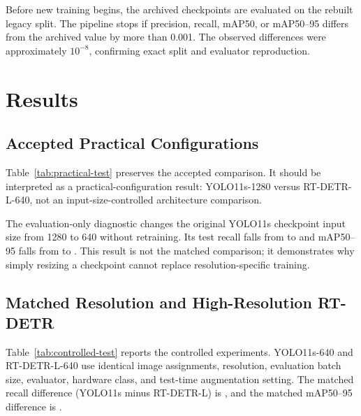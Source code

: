 \documentclass[runningheads]{llncs}
\begin{document}
Before new training begins, the archived checkpoints are evaluated on
the rebuilt legacy split. The pipeline stops if precision, recall,
mAP50, or mAP50--95 differs from the archived value by more than 0.001.
The observed differences were approximately $10^{-8}$, confirming exact
split and evaluator reproduction.

\section{Results}

\subsection{Accepted Practical Configurations}

Table~\ref{tab:practical-test} preserves the accepted comparison. It
should be interpreted as a practical-configuration result:
YOLO11s-1280 versus RT-DETR-L-640, not an input-size-controlled
architecture comparison.

\begin{table}
\caption{Accepted practical configurations on the test split. All values
are generated from the archived-checkpoint evaluation CSV.}
\label{tab:practical-test}
\centering
\small

\end{table}

The evaluation-only diagnostic changes the original YOLO11s checkpoint
input size from 1280 to 640 without retraining. Its test recall falls
from \OriginalYoloRecall{} to \DiagnosticYoloRecall{} and mAP50--95
falls from \OriginalYoloMAPStrict{} to \DiagnosticYoloMAPStrict{}.
This result is not the matched comparison; it demonstrates why simply
resizing a checkpoint cannot replace resolution-specific training.

\subsection{Matched Resolution and High-Resolution RT-DETR}

Table~\ref{tab:controlled-test} reports the controlled experiments.
YOLO11s-640 and RT-DETR-L-640 use identical image assignments,
resolution, evaluation batch size, evaluator, hardware class, and
test-time augmentation setting. The matched recall difference
(YOLO11s minus RT-DETR-L) is \MatchedRecallDelta{}, and the matched
mAP50--95 difference is \MatchedMAPStrictDelta{}.

\begin{table}
\caption{Resolution-controlled and high-resolution configurations on
the test split. Values are generated from the saved evaluation CSV.}
\label{tab:controlled-test}
\centering
\small

\end{table}
\end{document}
